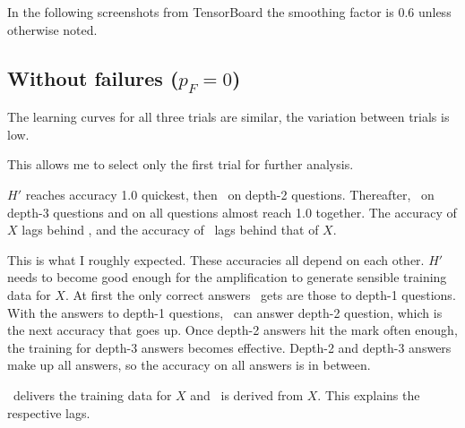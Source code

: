 \documentclass{farlamp}
\begin{document}
In the following screenshots from TensorBoard the smoothing factor is 0.6 unless
otherwise noted.

\subsection{Without failures ($p_F = 0$)}


\Obs The learning curves for all three trials are similar, the variation between
trials is low.

\Disc This allows me to select only the first trial for further analysis.


\Obs $H'$ reaches accuracy 1.0 quickest, then \AmpHp\ on depth-2 questions.
Thereafter, \AmpHp\ on depth-3 questions and on all questions almost reach 1.0
together. The accuracy of $X$ lags behind \AmpHp, and the accuracy of \Xpa\ lags
behind that of $X$.

\Disc This is what I roughly expected. These accuracies all depend on each
other. $H'$ needs to become good enough for the amplification to generate
sensible training data for $X$. At first the only correct answers \AmpHp\ gets
are those to depth-1 questions. With the answers to depth-1 questions, \AmpHp\
can answer depth-2 question, which is the next accuracy that goes up. Once
depth-2 answers hit the mark often enough, the training for depth-3 answers
becomes effective. Depth-2 and depth-3 answers make up all answers, so the
accuracy on all answers is in between.

\AmpHp\ delivers the training data for $X$ and \Xpa\ is derived from $X$. This
explains the respective lags.

\end{document}
